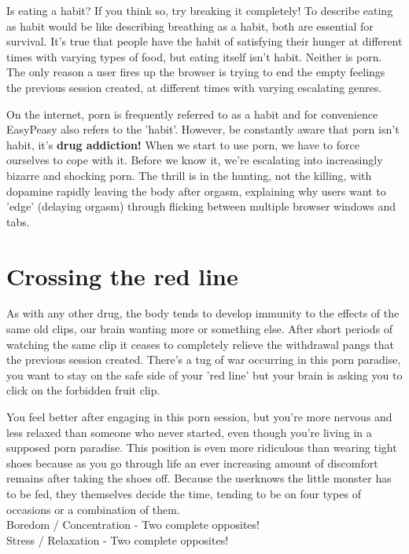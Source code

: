 \documentclass[
]{book}
\begin{document}
Is eating a habit? If you think so, try breaking it completely! To describe eating as habit would be like describing breathing as a habit, both are essential for survival. It's true that people have the habit of satisfying their hunger at different times with varying types of food, but eating itself isn't habit. Neither is porn. The only reason a user fires up the browser is trying to end the empty feelings the previous session created, at different times with varying escalating genres.

On the internet, porn is frequently referred to as a habit and for convenience EasyPeasy also refers to the 'habit'. However, be constantly aware that porn isn't habit, it's \textbf{drug addiction!} When we start to use porn, we have to force ourselves to cope with it. Before we know it, we're escalating into increasingly bizarre and shocking porn. The thrill is in the hunting, not the killing, with dopamine rapidly leaving the body after orgasm, explaining why users want to 'edge' (delaying orgasm) through flicking between multiple browser windows and tabs.

\hypertarget{crossing-the-red-line}{%
\section{Crossing the red line}\label{crossing-the-red-line}}

As with any other drug, the body tends to develop immunity to the effects of the same old clips, our brain wanting more or something else. After short periods of watching the same clip it ceases to completely relieve the withdrawal pangs that the previous session created. There's a tug of war occurring in this porn paradise, you want to stay on the safe side of your 'red line' but your brain is asking you to click on the forbidden fruit clip.

You feel better after engaging in this porn session, but you're more nervous and less relaxed than someone who never started, even though you're living in a supposed porn paradise. This position is even more ridiculous than wearing tight shoes because as you go through life an ever increasing amount of discomfort remains after taking the shoes off. Because the userknows the little monster has to be fed, they themselves decide the time, tending to be on four types of occasions or a combination of them.\\
Boredom / Concentration - Two complete opposites!\\
Stress / Relaxation - Two complete opposites!
\end{document}
